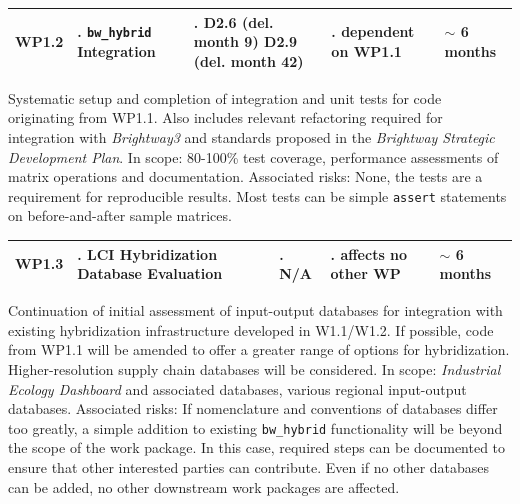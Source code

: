 \documentclass{article}
\begin{document}
    \begin{table}[H]
        \centering
        \begin{tabularx}{\linewidth}{
            |>{\hsize=0.25\hsize}X
            |>{\hsize=1.\hsize}X
            |>{\hsize=1.\hsize}X
            |>{\hsize=1.\hsize}X
            |>{\hsize=0.75\hsize}X|
          } %
            \hline
                WP1.2
            &
                \texttt{bw\_hybrid} Integration
            &
                D2.6 (del. month 9) \newline D2.9 (del. month 42)
            &
                dependent on WP1.1
            &
                $\sim$ 6 months
            \\
            \hline
        \end{tabularx}
    \end{table}
    \vspace*{-9pt}
    
    Systematic setup and completion of integration and unit tests for code originating from WP1.1. Also includes relevant refactoring required for integration with \textit{Brightway3} and standards proposed in the \textit{Brightway Strategic Development Plan}.  In scope: 80-100\% test coverage, performance assessments of matrix operations and documentation. Associated risks: None, the tests are a requirement for reproducible results. Most tests can be simple \texttt{assert} statements on before-and-after sample matrices.

    \begin{table}[H]
        \centering
        \begin{tabularx}{\linewidth}{
            |>{\hsize=0.25\hsize}X
            |>{\hsize=1.\hsize}X
            |>{\hsize=1.\hsize}X
            |>{\hsize=1.\hsize}X
            |>{\hsize=0.75\hsize}X|
          } %
            \hline
                WP1.3
            &
                LCI Hybridization Database Evaluation
            &
                N/A
            &
                affects no other WP
            &
                $\sim$ 6 months
            \\
            \hline
        \end{tabularx}
    \end{table}
    \vspace*{-9pt}
    
    Continuation of initial assessment of input-output databases for integration with existing hybridization infrastructure developed in W1.1/W1.2. If possible, code from WP1.1 will be amended to offer a greater range of options for hybridization. Higher-resolution supply chain databases will be considered. In scope: \textit{Industrial Ecology Dashboard} and associated databases, various regional input-output databases. Associated risks: If nomenclature and conventions of databases differ too greatly, a simple addition to existing \texttt{bw\_hybrid} functionality will be beyond the scope of the work package. In this case, required steps can be documented to ensure that other interested parties can contribute. Even if no other databases can be added, no other downstream work packages are affected.
    
\end{document}
